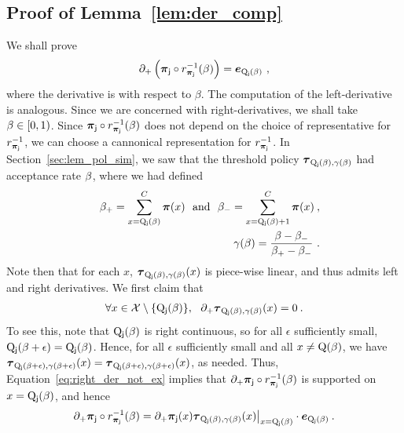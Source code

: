 \subsection{Proof of Lemma~\ref{lem:der_comp}~\label{sec:der_comp_proof}}
	We shall prove 
	\begin{eqnarray}
	\partial_+ \left(\boldsymbol{\pi}_{\mathsf{j}} \circ r_{\boldsymbol{\pi}_{\mathsf{j}}}^{-1}(\beta)\right) = \boldsymbol{e}_{\mathrm{Q}_{\mathsf{j}}(\beta)}~,
	\end{eqnarray}
	where the derivative is with respect to $\beta$.
	The computation of the left-derivative is analogous. Since we are concerned with right-derivatives, we shall take $\beta \in [0,1)$.
	Since $\boldsymbol{\pi}_{\mathsf{j}} \circ r_{\boldsymbol{\pi}_{\mathsf{j}}}^{-1}(\beta)$ does not depend on the choice of representative for $r_{\boldsymbol{\pi}_{\mathsf{j}}}^{-1}$, we can choose a cannonical representation for $r_{\boldsymbol{\pi}_{\mathsf{j}}}^{-1}$. 
	In Section~\ref{sec:lem_pol_sim}, we saw that the threshold policy $\boldsymbol{\tau}_{\mathrm{Q}_{\mathsf{j}}(\beta),\gamma(\beta)}$ had acceptance rate $\beta$, where we had defined 
	\begin{eqnarray}
	&&\beta_+ = \sum_{x=\mathrm{Q}_{\mathsf{j}}(\beta)}^C\boldsymbol{\pi}(x)~\text{ and }~\beta_- = \sum_{x=\mathrm{Q}_{\mathsf{j}}(\beta) + 1}^C\boldsymbol{\pi}(x)\:,\\
	&&\gamma(\beta) = \frac{\beta - \beta_-}{\beta_+ - \beta_-}~.
	\end{eqnarray}
	Note then that for each $x$, $\boldsymbol{\tau}_{\mathrm{Q}_{\mathsf{j}}(\beta),\gamma(\beta)}(x)$ is piece-wise linear, and thus admits left and right derivatives. We first claim that
	\begin{eqnarray}\label{eq:right_der_not_ex}
	\forall x \in \mathcal{X} \setminus \{\mathrm{Q}_{\mathsf{j}}(\beta)\},~~\partial_+ \boldsymbol{\tau}_{\mathrm{Q}_{\mathsf{j}}(\beta),\gamma(\beta)}(x) = 0 \:.
	\end{eqnarray}
	To see this, note that $\mathrm{Q}_{\mathsf{j}}(\beta)$ is right continuous, so for all $\epsilon$ sufficiently small, $\mathrm{Q}_{\mathsf{j}}(\beta + \epsilon) = \mathrm{Q}_{\mathsf{j}}(\beta)$. Hence, for all $\epsilon$ sufficiently small and all $x \ne \mathrm{Q}(\beta)$, we have $\boldsymbol{\tau}_{\mathrm{Q}_{\mathsf{j}}(\beta+\epsilon),\gamma(\beta + \epsilon)}(x) = \boldsymbol{\tau}_{\mathrm{Q}_{\mathsf{j}}(\beta+\epsilon),\gamma(\beta + \epsilon)}(x)$, as needed. 
	Thus, Equation~\eqref{eq:right_der_not_ex} implies that $\partial_+ \boldsymbol{\pi}_{\mathsf{j}} \circ r_{\boldsymbol{\pi}_{\mathsf{j}}}^{-1}(\beta)$ is supported on $x = \mathrm{Q}_{\mathsf{j}}(\beta)$, and hence
	\begin{eqnarray*}
	\partial_+ \boldsymbol{\pi}_{\mathsf{j}} \circ r_{\boldsymbol{\pi}_{\mathsf{j}}}^{-1}(\beta) = \partial_+ \boldsymbol{\pi}_{\mathsf{j}}(x)\boldsymbol{\tau}_{\mathrm{Q}_{\mathsf{j}}(\beta),\gamma(\beta)}(x) \big{|}_{x = \mathrm{Q}_{\mathsf{j}}(\beta)} \cdot \boldsymbol{e}_{\mathrm{Q}_{\mathsf{j}}(\beta)}\:.
	\end{eqnarray*}

